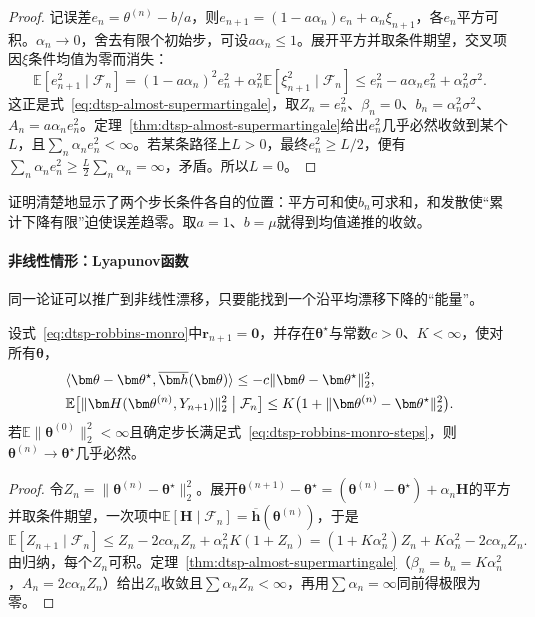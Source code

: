 \begin{proof}
记误差$e_n=\theta^{(n)}-b/a$，则$e_{n+1}=(1-a\alpha_n)e_n+\alpha_n\xi_{n+1}$，各$e_n$平方可积。$\alpha_n\to0$，舍去有限个初始步，可设$a\alpha_n\leq1$。展开平方并取条件期望，交叉项因$\xi$条件均值为零而消失：
\[
  \mathbb E[e_{n+1}^2\mid\mathcal F_n]=(1-a\alpha_n)^2e_n^2+\alpha_n^2\mathbb E[\xi_{n+1}^2\mid\mathcal F_n]\leq e_n^2-a\alpha_ne_n^2+\alpha_n^2\sigma^2.
\]
这正是式~\eqref{eq:dtsp-almost-supermartingale}，取$Z_n=e_n^2$、$\beta_n=0$、$b_n=\alpha_n^2\sigma^2$、$A_n=a\alpha_ne_n^2$。定理~\ref{thm:dtsp-almost-supermartingale}给出$e_n^2$几乎必然收敛到某个$L$，且$\sum_n\alpha_ne_n^2<\infty$。若某条路径上$L>0$，最终$e_n^2\geq L/2$，便有$\sum_n\alpha_ne_n^2\geq\frac L2\sum_n\alpha_n=\infty$，矛盾。所以$L=0$。
\end{proof}

证明清楚地显示了两个步长条件各自的位置：平方可和使$b_n$可求和，和发散使“累计下降有限”迫使误差趋零。取$a=1$、$b=\mu$就得到均值递推的收敛。

\paragraph{非线性情形：Lyapunov函数}
同一论证可以推广到非线性漂移，只要能找到一个沿平均漂移下降的“能量”。

\begin{theorem}[强单调漂移下的几乎必然收敛]
  \label{thm:dtsp-sa-lyapunov}
  设式~\eqref{eq:dtsp-robbins-monro}中$\bm r_{n+1}=\bm 0$，并存在$\bm\theta^\star$与常数$c>0$、$K<\infty$，使对所有$\bm\theta$，
  \[
    \begin{aligned}
      &\langle\bm\theta-\bm\theta^\star,\overline{\bm h}(\bm\theta)\rangle\leq-c\lVert\bm\theta-\bm\theta^\star\rVert_2^2,\\
      &\mathbb E\bigl[\lVert\bm H(\bm\theta^{(n)},Y_{n+1})\rVert_2^2\bigm|\mathcal F_n\bigr]\leq K\bigl(1+\lVert\bm\theta^{(n)}-\bm\theta^\star\rVert_2^2\bigr).
    \end{aligned}
  \]
  若$\mathbb E\lVert\bm\theta^{(0)}\rVert_2^2<\infty$且确定步长满足式~\eqref{eq:dtsp-robbins-monro-steps}，则$\bm\theta^{(n)}\to\bm\theta^\star$几乎必然。
\end{theorem}

\begin{proof}
令$Z_n=\lVert\bm\theta^{(n)}-\bm\theta^\star\rVert_2^2$。展开$\bm\theta^{(n+1)}-\bm\theta^\star=(\bm\theta^{(n)}-\bm\theta^\star)+\alpha_n\bm H$的平方并取条件期望，一次项中$\mathbb E[\bm H\mid\mathcal F_n]=\overline{\bm h}(\bm\theta^{(n)})$，于是
\[
  \mathbb E[Z_{n+1}\mid\mathcal F_n]\leq Z_n-2c\alpha_nZ_n+\alpha_n^2K(1+Z_n)=(1+K\alpha_n^2)Z_n+K\alpha_n^2-2c\alpha_nZ_n.
\]
由归纳，每个$Z_n$可积。定理~\ref{thm:dtsp-almost-supermartingale}（$\beta_n=b_n=K\alpha_n^2$，$A_n=2c\alpha_nZ_n$）给出$Z_n$收敛且$\sum\alpha_nZ_n<\infty$，再用$\sum\alpha_n=\infty$同前得极限为零。
\end{proof}

